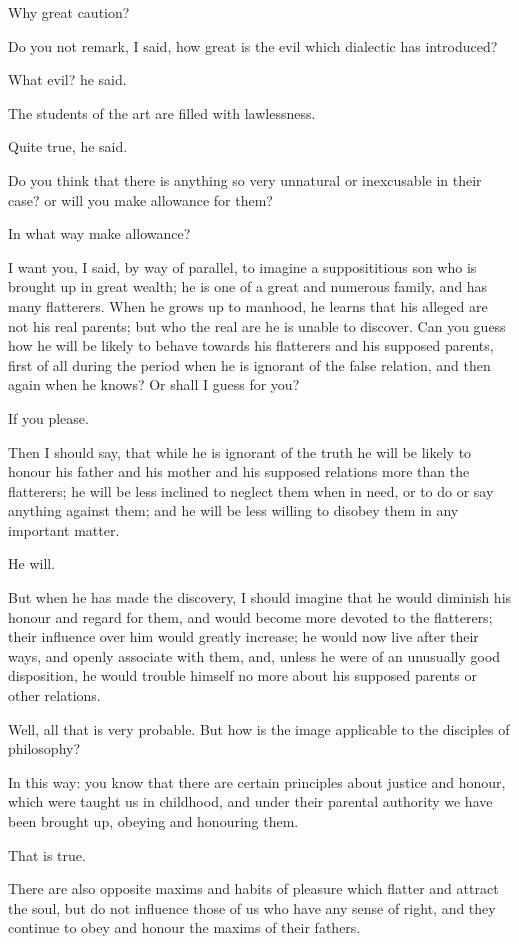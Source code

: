 Why great caution?

Do you not remark, I said, how great is the evil which dialectic has
introduced?

What evil? he said.

The students of the art are filled with lawlessness.

Quite true, he said.

Do you think that there is anything so very unnatural or inexcusable in
their case? or will you make allowance for them?

In what way make allowance?

I want you, I said, by way of parallel, to imagine a supposititious son
who is brought up in great wealth; he is one of a great and numerous
family, and has many flatterers. When he grows up to manhood, he learns
that his alleged are not his real parents; but who the real are he
is unable to discover. Can you guess how he will be likely to behave
towards his flatterers and his supposed parents, first of all during the
period when he is ignorant of the false relation, and then again when he
knows? Or shall I guess for you?

If you please.

Then I should say, that while he is ignorant of the truth he will be
likely to honour his father and his mother and his supposed relations
more than the flatterers; he will be less inclined to neglect them when
in need, or to do or say anything against them; and he will be less
willing to disobey them in any important matter.

He will.

But when he has made the discovery, I should imagine that he would
diminish his honour and regard for them, and would become more devoted
to the flatterers; their influence over him would greatly increase; he
would now live after their ways, and openly associate with them, and,
unless he were of an unusually good disposition, he would trouble
himself no more about his supposed parents or other relations.

Well, all that is very probable. But how is the image applicable to the
disciples of philosophy?

In this way: you know that there are certain principles about justice
and honour, which were taught us in childhood, and under their parental
authority we have been brought up, obeying and honouring them.

That is true.

There are also opposite maxims and habits of pleasure which flatter and
attract the soul, but do not influence those of us who have any sense of
right, and they continue to obey and honour the maxims of their fathers.

